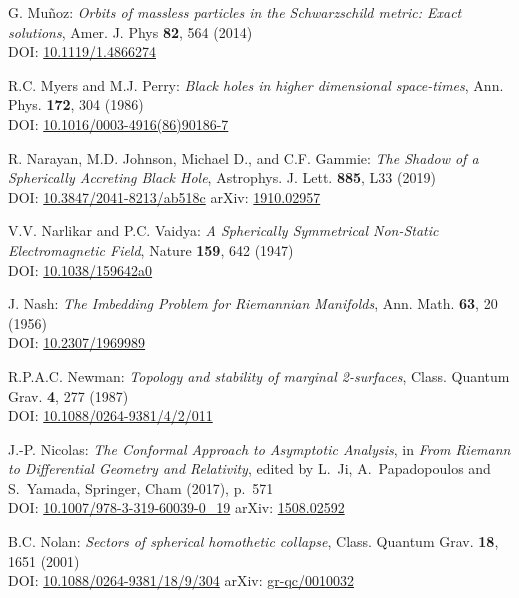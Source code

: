 \begin{thebibliography}{123}
G. Mu\~noz:
{\em Orbits of massless particles in the Schwarzschild metric: Exact solutions},
Amer. J. Phys {\bf 82}, 564 (2014)\\
DOI: \href{https://doi.org/10.1119/1.4866274}{10.1119/1.4866274}

R.C. Myers and M.J. Perry:
{\em Black holes in higher dimensional space-times},
Ann. Phys. {\bf 172}, 304 (1986)\\
DOI: \href{https://doi.org/10.1016/0003-4916(86)90186-7}{10.1016/0003-4916(86)90186-7}

R. Narayan, M.D. Johnson, Michael D., and C.F. Gammie:
{\em The Shadow of a Spherically Accreting Black Hole},
Astrophys. J. Lett. {\bf 885}, L33 (2019)\\
DOI: \href{https://doi.org/10.3847/2041-8213/ab518c}{10.3847/2041-8213/ab518c}\hfill
arXiv: \href{https://arxiv.org/abs/1910.02957}{1910.02957}

V.V. Narlikar and P.C. Vaidya:
{\em A Spherically Symmetrical Non-Static Electromagnetic Field},
Nature {\bf 159}, 642 (1947) \\
DOI: \href{https://doi.org/10.1038/159642a0}{10.1038/159642a0}

J. Nash:
{\em The Imbedding Problem for Riemannian Manifolds},
Ann. Math. {\bf 63}, 20 (1956)\\
DOI: \href{https://doi.org/10.2307/1969989}{10.2307/1969989}

R.P.A.C. Newman:
{\em Topology and stability of marginal 2-surfaces},
Class. Quantum Grav. {\bf 4}, 277 (1987)\\
DOI: \href{https://doi.org/10.1088/0264-9381/4/2/011}{10.1088/0264-9381/4/2/011}

J.-P. Nicolas:
{\em The Conformal Approach to Asymptotic Analysis},
in {\em From Riemann to Differential Geometry and Relativity},
edited by L.~Ji, A.~Papadopoulos and S.~Yamada, Springer, Cham (2017), p.~571\\
DOI: \href{https://doi.org/10.1007/978-3-319-60039-0_19}{10.1007/978-3-319-60039-0\_19}\hfill
arXiv: \href{https://arxiv.org/abs/1508.02592}{1508.02592}

B.C. Nolan:
{\em Sectors of spherical homothetic collapse},
Class. Quantum Grav. {\bf 18}, 1651 (2001)\\
DOI: \href{https://doi.org/10.1088/0264-9381/18/9/304}{10.1088/0264-9381/18/9/304}\hfill
arXiv: \href{https://arxiv.org/abs/gr-qc/0010032}{gr-qc/0010032}


\end{thebibliography}
